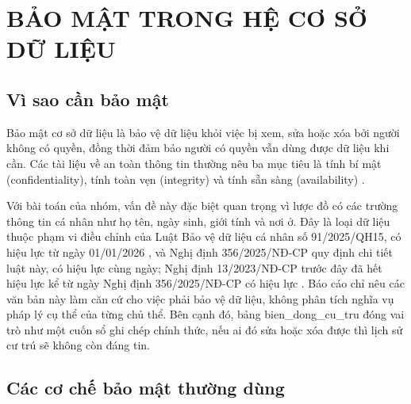 \section{BẢO MẬT TRONG HỆ CƠ SỞ DỮ LIỆU}
\label{sec:chuong6}

\subsection{Vì sao cần bảo mật}
\label{subsec:visao}

Bảo mật cơ sở dữ liệu là bảo vệ dữ liệu khỏi việc bị xem, sửa hoặc xóa bởi người không có quyền, đồng thời đảm bảo người có quyền vẫn dùng được dữ liệu khi cần. Các tài liệu về an toàn thông tin thường nêu ba mục tiêu là tính bí mật (confidentiality), tính toàn vẹn (integrity) và tính sẵn sàng (availability) \cite{elmasri}.

Với bài toán của nhóm, vấn đề này đặc biệt quan trọng vì lược đồ có các trường thông tin cá nhân như họ tên, ngày sinh, giới tính và nơi ở. Đây là loại dữ liệu thuộc phạm vi điều chỉnh của Luật Bảo vệ dữ liệu cá nhân số 91/2025/QH15, có hiệu lực từ ngày 01/01/2026 \cite{luat91}, và Nghị định 356/2025/NĐ-CP quy định chi tiết luật này, có hiệu lực cùng ngày; Nghị định 13/2023/NĐ-CP trước đây đã hết hiệu lực kể từ ngày Nghị định 356/2025/NĐ-CP có hiệu lực \cite{nd356}. Báo cáo chỉ nêu các văn bản này làm căn cứ cho việc phải bảo vệ dữ liệu, không phân tích nghĩa vụ pháp lý cụ thể của từng chủ thể. Bên cạnh đó, bảng bien\_dong\_cu\_tru đóng vai trò như một cuốn sổ ghi chép chính thức, nếu ai đó sửa hoặc xóa được thì lịch sử cư trú sẽ không còn đáng tin.

\subsection{Các cơ chế bảo mật thường dùng}
\label{subsec:coche}

